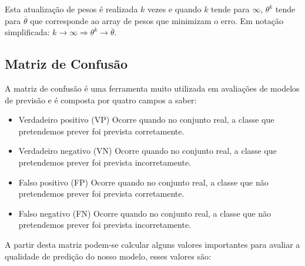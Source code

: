 \hfill\newline

Esta atualização de pesos é realizada $k$ vezes e quando $k$ tende para $\infty$, $\theta^k$ tende para $\overline{\theta}$ que corresponde ao array de pesos que minimizam o erro\cite{ref2}. Em notação simplificada:
 $k \xrightarrow{} \infty \Rightarrow \theta^k \xrightarrow{} \overline{\theta}$.\hfill\newline



\subsection{Matriz de Confusão}

A matriz de confusão é uma ferramenta muito utilizada em avaliações de modelos de previsão e é composta por quatro campos a saber\cite{ref9}:
\begin{itemize}
  \item Verdadeiro positivo (VP)\hfill\newline
  \hfill\newline
  Ocorre quando no conjunto real, a classe que pretendemos prever foi prevista corretamente.  \hfill\newline
  \item Verdadeiro negativo (VN)\hfill\newline
  \hfill\newline
  Ocorre quando no conjunto real, a classe que pretendemos prever foi prevista incorretamente.\hfill\newline
  \item Falso positivo (FP)\hfill\newline
  \hfill\newline
  Ocorre quando no conjunto real, a classe que não pretendemos prever foi prevista corretamente.\hfill\newline
  \item Falso negativo (FN)\hfill\newline
  \hfill\newline
  Ocorre quando no conjunto real, a classe que não pretendemos prever foi prevista incorretamente.\hfill\newline
\end{itemize}

A partir desta matriz podem-se calcular alguns valores importantes para avaliar a qualidade de predição do nosso modelo, esses valores são\cite{ref9}:

